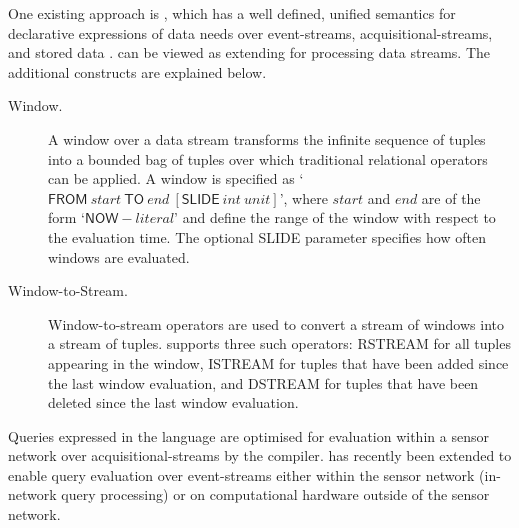 One existing approach is \sneeql, which has a well defined, unified semantics for declarative expressions of data needs over event-streams, acquisitional-streams, and stored data \cite{Brenninkmeijer_08}.
\sneeql can be viewed as extending \sql for processing data streams.
The additional constructs are explained below.
\begin{description}
\item[Window.] A window over a data stream transforms the infinite sequence of tuples into a bounded bag of tuples over which traditional relational operators can be applied. A window is specified as `$\textsf{FROM}\ {start}\ \textsf{TO}\ {end}\ [\textsf{SLIDE}\ {int}\ {unit}]$', where ${start}$ and ${end}$ are of the form `$\textsf{NOW} - {literal}$' and define the range of the window with respect to the evaluation time. The optional \textsf{SLIDE} parameter specifies how often windows are evaluated.

\item[Window-to-Stream.] Window-to-stream operators are used to convert a stream of windows into a stream of tuples. \sneeql supports three such operators: \textsf{RSTREAM} for all tuples appearing in the window, \textsf{ISTREAM} for tuples that have been added since the last window evaluation, and \textsf{DSTREAM} for tuples that have been deleted since the last window evaluation.
\end{description}
Queries expressed in the \sneeql language are optimised for evaluation within a sensor network over acquisitional-streams by the \snee compiler\cite{Galpin_09}. \snee has recently been extended to enable query evaluation over event-streams either within the sensor network (in-network query processing) or on computational hardware outside of the sensor network.



